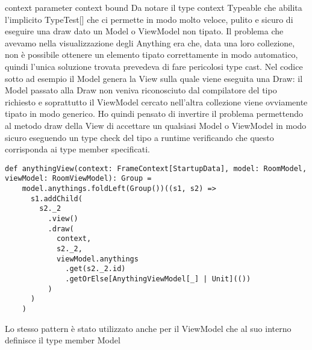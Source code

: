 context parameter
context bound
Da notare il type context Typeable che abilita l'implicito TypeTest[] che ci permette in modo molto veloce, pulito e sicuro di eseguire una draw dato un Model o ViewModel non tipato.
Il problema che avevamo nella visualizzazione degli Anything era che, data una loro collezione, non è possibile ottenere un elemento tipato correttamente in modo automatico, quindi l'unica soluzione trovata prevedeva di fare pericolosi type cast.
Nel codice sotto ad esempio il Model genera la View sulla quale viene eseguita una Draw: il Model passato alla Draw non veniva riconosciuto dal compilatore del tipo richiesto e soprattutto il ViewModel cercato nell'altra collezione viene ovviamente tipato in modo generico. 
Ho quindi pensato di invertire il problema permettendo al metodo draw della View di accettare un qualsiasi Model o ViewModel in modo sicuro eseguendo un type check del tipo a runtime verificando che questo corrisponda ai type member specificati.

\begin{lstlisting}[basicstyle=\tiny]
def anythingView(context: FrameContext[StartupData], model: RoomModel, viewModel: RoomViewModel): Group =
    model.anythings.foldLeft(Group())((s1, s2) =>
      s1.addChild(
        s2._2
          .view()
          .draw(
            context,
            s2._2,
            viewModel.anythings
              .get(s2._2.id)
              .getOrElse[AnythingViewModel[_] | Unit](())
          )
      )
    )
\end{lstlisting}   

Lo stesso pattern è stato utilizzato anche per il ViewModel che al suo interno definisce il type member Model
